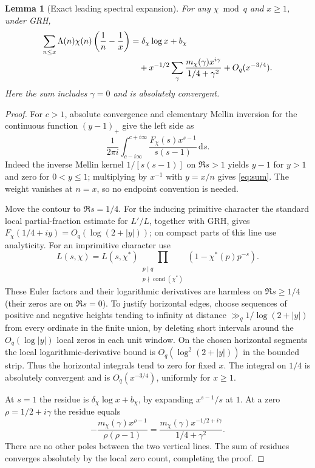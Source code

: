 \documentclass[11pt]{article}
\newtheorem{lemma}[theorem]{Lemma}
\theoremstyle{remark}\newtheorem{remark}[theorem]{Remark}
\newcommand{\dd}{\,\mathrm d}
\begin{document}
\begin{lemma}[Exact leading spectral expansion]\label{lem:exp}
For any $\chi\bmod q$ and $x\ge1$, under GRH,
\begin{align}\label{eq:char}
 \sum_{n\le x}\Lambda(n)\chi(n)\left(\frac1n-\frac1x\right)
 &=\delta_\chi\log x+b_\chi\\[-2pt]
 &\quad+x^{-1/2}\sum_{\gamma}\frac{m_\chi(\gamma)x^{i\gamma}}{1/4+\gamma^2}
 +O_q(x^{-3/4}).\notag
\end{align}
Here the sum includes $\gamma=0$ and is absolutely convergent.
\end{lemma}
\begin{proof}
For $c>1$, absolute convergence and elementary Mellin inversion for the continuous function $(y-1)_+$ give the left side as
\[
 \frac1{2\pi i}\int_{c-i\infty}^{c+i\infty}
 \frac{F_\chi(s)x^{s-1}}{s(s-1)}\dd s.
\]
Indeed the inverse Mellin kernel $1/[s(s-1)]$ on $\Re s>1$ yields $y-1$ for $y>1$ and zero for $0<y\le1$; multiplying by $x^{-1}$ with $y=x/n$ gives \eqref{eq:sum}. The weight vanishes at $n=x$, so no endpoint convention is needed.

Move the contour to $\Re s=1/4$. For the inducing primitive character the standard local partial-fraction estimate for $L'/L$, together with GRH, gives $F_\chi(1/4+iy)=O_q(\log(2+|y|))$; on compact parts of this line use analyticity. For an imprimitive character use
\[
 L(s,\chi)=L(s,\chi^*)\prod_{\substack{p\mid q\\p\nmid\operatorname{cond}(\chi^*)}}(1-\chi^*(p)p^{-s}).
\]
These Euler factors and their logarithmic derivatives are harmless on $\Re s\ge1/4$ (their zeros are on $\Re s=0$). To justify horizontal edges, choose sequences of positive and negative heights tending to infinity at distance $\gg_q1/\log(2+|y|)$ from every ordinate in the finite union, by deleting short intervals around the $O_q(\log |y|)$ local zeros in each unit window. On the chosen horizontal segments the local logarithmic-derivative bound is $O_q(\log^2(2+|y|))$ in the bounded strip. Thus the horizontal integrals tend to zero for fixed $x$. The integral on $1/4$ is absolutely convergent and is $O_q(x^{-3/4})$, uniformly for $x\ge1$.

At $s=1$ the residue is $\delta_\chi\log x+b_\chi$, by expanding $x^{s-1}/s$ at $1$. At a zero $\rho=1/2+i\gamma$ the residue equals
\[
 -\frac{m_\chi(\gamma)x^{\rho-1}}{\rho(\rho-1)}
 =\frac{m_\chi(\gamma)x^{-1/2+i\gamma}}{1/4+\gamma^2}.
\]
There are no other poles between the two vertical lines. The sum of residues converges absolutely by the local zero count, completing the proof.
\end{proof}
\end{document}
